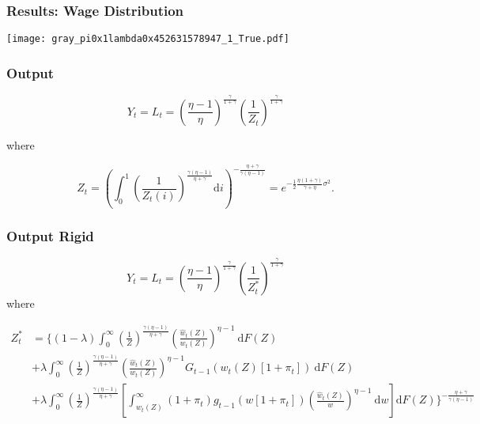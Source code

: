 \documentclass{beamer}
\begin{document}
\begin{frame}[t]\frametitle{Results: Wage Distribution}

    \begin{center}
      \texttt{[image: gray\_pi0x1lambda0x452631578947\_1\_True.pdf]}
      \label{fig:dist_1_periods}
    \end{center}


\end{frame}


\begin{frame}[t]\frametitle{Output}

    \begin{equation*}
        \label{eq:output_flexible}
        Y_t = L_t = \left( \frac{\eta - 1}{\eta} \right)^{\frac{\gamma}{1 + \gamma}} \left( \frac{1}{Z_t} \right)^{\frac{\gamma}{1 + \gamma}}
    \end{equation*}

    where

    \begin{equation*}
        Z_t = \left( \int_{0}^{1}\! \left( \frac{1}{Z_t(i)} \right)^{\frac{\gamma(\eta - 1)}{\eta + \gamma}} \mathup{d}i \right)^{-\frac{\eta + \gamma}{\gamma(\eta - 1)}} \!\!\! = e^{-\frac{1}{2} \frac{\eta(1 + \gamma)}{\gamma + \eta}\sigma^2 }.
    \end{equation*}


\end{frame}

\begin{frame}[t]\frametitle{Output Rigid}

    \begin{equation*}
        \label{eq:output_rigid}
        Y_t = L_t = \left(\frac{\eta - 1}{\eta} \right)^{\frac{\gamma}{1 + \gamma}}\left( \frac{1}{Z_t^*} \right)^{\frac{\gamma}{1 + \gamma}}
    \end{equation*}
    where

    \begin{equation*}
        \label{eq:z_star}
        \begin{split}
        Z_t^* &= \Big\{(1 - \lambda) \int_{0}^{\infty} \! \left( \frac{1}{Z} \right)^{\frac{\gamma(\eta - 1)}{\eta + \gamma}} \left( \frac{\hat{w}_t(Z)}{w_t(Z)} \right)^{\eta - 1}\ \mathup{d}F(Z) \\
              &+            \lambda  \int_{0}^{\infty} \! \left( \frac{1}{Z} \right)^{\frac{\gamma(\eta - 1)}{\eta + \gamma}} \left( \frac{\hat{w}_t(Z)}{w_t(Z)} \right)^{\eta - 1} G_{t-1}\left( w_t(Z)[1 + \pi_t] \right)                                                     \ \mathup{d}F(Z)\\
              &+            \lambda  \int_{0}^{\infty} \! \left( \frac{1}{Z} \right)^{\frac{\gamma(\eta - 1)}{\eta + \gamma}} \left[ \int_{w_t(Z)}^{\infty} (1 + \pi_t)g_{t-1}\left( w[1 + \pi_t] \right) \left( \frac{\hat{w}_t(Z)}{w} \right)^{\eta - 1}\ \mathup{d}w \right] \mathup{d}F(Z)
                \Big\}^{-\frac{\eta + \gamma}{\gamma(\eta - 1)}}
        \end{split}
    \end{equation*}

\end{frame}
\end{document}
